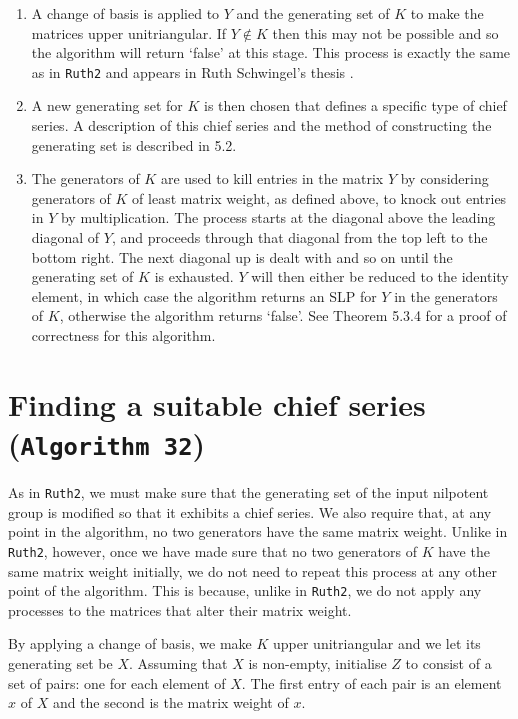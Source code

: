 \documentclass[12pt]{report}
\begin{document}
\begin{enumerate}

\item A change of basis is applied to $Y$ and the generating set of $K$ to make the matrices upper unitriangular. If $Y \notin K$ then this may not be possible and so the algorithm will return `false' at this stage. This process is exactly the same as in {\tt Ruth2} and appears in Ruth Schwingel's thesis \cite{Ruth}.

\item A new generating set for $K$ is then chosen that defines a specific type of chief series. A description of this chief series and the method of constructing the generating set is described in 5.2.

\item The generators of $K$ are used to kill entries in the matrix $Y$ by considering generators of $K$ of least matrix weight, as defined above, to knock out entries in $Y$ by multiplication. The process starts at the diagonal above the leading diagonal of $Y$, and proceeds through that diagonal from the top left to the bottom right. The next diagonal up is dealt with and so on until the generating set of $K$ is exhausted. $Y$ will then either be reduced to the identity element, in which case the algorithm returns an SLP for $Y$ in the generators of $K$, otherwise the algorithm returns `false'. See Theorem 5.3.4 for a proof of correctness for this algorithm.

\end{enumerate}

\section{Finding a suitable chief series ({\tt Algorithm 32})}

As in {\tt Ruth2}, we must make sure that the generating set of the input nilpotent group is modified so that it exhibits a chief series. We also require that, at any point in the algorithm, no two generators have the same matrix weight. Unlike in {\tt Ruth2}, however, once we have made sure that no two generators of $K$ have the same matrix weight initially, we do not need to repeat this process at any other point of the algorithm. This is because, unlike in {\tt Ruth2}, we do not apply any processes to the matrices that alter their matrix weight.

By applying a change of basis, we make $K$ upper unitriangular and we let its generating set be $X$. Assuming that $X$ is non-empty, initialise $Z$ to consist of a set of pairs: one for each element of $X$. The first entry of each pair is an element $x$ of $X$ and the second is the matrix weight of $x$.
\end{document}
